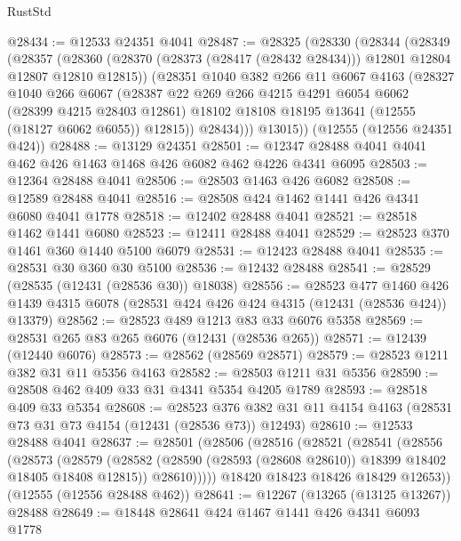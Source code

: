 \begin{lexlean}{RustStd}
\begin{coremodule}
@28434 := @12533 @24351 @4041
@28487 := @28325
    (@28330
      (@28344
        (@28349
          (@28357
            (@28360 (@28370 (@28373 (@28417 (@28432 @28434))) @12801 @12804 @12807 @12810 @12815))
            (@28351
              @1040
              @382
              @266
              @11
              @6067
              @4163
              (@28327
                @1040
                @266
                @6067
                (@28387
                  @22
                  @269
                  @266
                  @4215
                  @4291
                  @6054
                  @6062
                  (@28399 @4215 @28403 @12861)
                  @18102
                  @18108
                  @18195
                  @13641
                  (@12555 (@18127 @6062 @6055))
                  @12815))
              @28434)))
        @13015))
    (@12555 (@12556 @24351 @424))
@28488 := @13129 @24351
@28501 := @12347 @28488 @4041 @4041 @462 @426 @1463 @1468 @426 @6082 @462 @4226 @4341 @6095
@28503 := @12364 @28488 @4041
@28506 := @28503 @1463 @426 @6082
@28508 := @12589 @28488 @4041
@28516 := @28508 @424 @1462 @1441 @426 @4341 @6080 @4041 @1778
@28518 := @12402 @28488 @4041
@28521 := @28518 @1462 @1441 @6080
@28523 := @12411 @28488 @4041
@28529 := @28523 @370 @1461 @360 @1440 @5100 @6079
@28531 := @12423 @28488 @4041
@28535 := @28531 @30 @360 @30 @5100
@28536 := @12432 @28488
@28541 := @28529 (@28535 (@12431 (@28536 @30)) @18038)
@28556 := @28523
    @477
    @1460
    @426
    @1439
    @4315
    @6078
    (@28531 @424 @426 @424 @4315 (@12431 (@28536 @424)) @13379)
@28562 := @28523 @489 @1213 @83 @33 @6076 @5358
@28569 := @28531 @265 @83 @265 @6076 (@12431 (@28536 @265))
@28571 := @12439 (@12440 @6076)
@28573 := @28562 (@28569 @28571)
@28579 := @28523 @1211 @382 @31 @11 @5356 @4163
@28582 := @28503 @1211 @31 @5356
@28590 := @28508 @462 @409 @33 @31 @4341 @5354 @4205 @1789
@28593 := @28518 @409 @33 @5354
@28608 := @28523
    @376
    @382
    @31
    @11
    @4154
    @4163
    (@28531 @73 @31 @73 @4154 (@12431 (@28536 @73)) @12493)
@28610 := @12533 @28488 @4041
@28637 := @28501
    (@28506
      (@28516
        (@28521
          (@28541
            (@28556
              (@28573
                (@28579
                  (@28582 (@28590 (@28593 (@28608 @28610)) @18399 @18402 @18405 @18408 @12815))
                  @28610)))))
        @18420
        @18423
        @18426
        @18429
        @12653))
    (@12555 (@12556 @28488 @462))
@28641 := @12267 (@13265 (@13125 @13267)) @28488
@28649 := @18448 @28641 @424 @1467 @1441 @426 @4341 @6093 @1778

\end{coremodule}
\end{lexlean}
